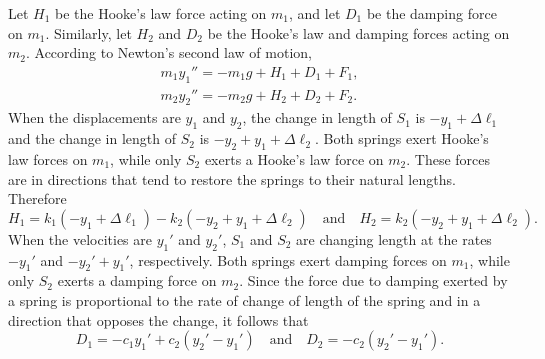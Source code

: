 \documentclass{ximera}
\begin{document}
\begin{example}
\begin{explanation}
Let $H_1$ be the Hooke's law force acting on $m_1$, and let $D_1$ be
the damping force on $m_1$. Similarly, let $H_2$ and $D_2$ be the
Hooke's law and damping forces acting on $m_2$. According to Newton's
second law of motion,
\begin{equation} \label{eq:10.1.8}
\begin{array}{ccl}
m_1y_1''=-m_1g+H_1+D_1+F_1,\\
m_2y_2''=-m_2g+H_2+D_2+F_2.
\end{array}
\end{equation}
When the displacements are $y_1$ and $y_2$, the change in length of
$S_1$ is $-y_1+\Delta\ell_1$ and the change in length of $S_2$ is
$-y_2+y_1+\Delta\ell_2$. Both springs exert Hooke's law forces on $m_1$,
while only $S_2$ exerts a Hooke's law force on $m_2$. These forces are
in directions that tend to restore the springs to their natural
lengths. Therefore
\begin{equation} \label{eq:10.1.9}
H_1=k_1(-y_1+\Delta\ell_1)-k_2(-y_2+y_1+\Delta\ell_2)\quad\mbox{and}\quad H_2=k_2(-y_2+y_1+\Delta\ell_2).
\end{equation}
When the velocities are $y_1'$ and $y_2'$,  $S_1$ and $S_2$ are
changing length at the rates $-y_1'$ and $-y_2'+y_1'$, respectively.
Both springs exert damping forces on $m_1$, while only $S_2$ exerts a
damping force on $m_2$. Since the force due to damping exerted by a
spring is proportional to the rate of change of length of the spring
and in a direction that opposes the change, it follows that
\begin{equation} \label{eq:10.1.10}
D_1=-c_1y_1'+c_2(y_2'-y_1')\quad\mbox{and}\quad
D_2=-c_2(y_2'-y_1').
\end{equation}


\end{explanation}
\end{example}
\end{document}
